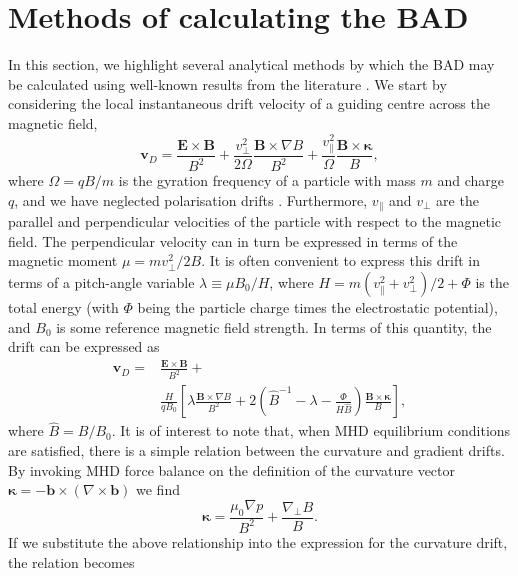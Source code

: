 \section{Methods of calculating the BAD}
In this section, we highlight several analytical methods by which the BAD may be calculated using well-known results from the literature \cite{helander2014theory}. We start by considering the local instantaneous drift velocity of a guiding centre across the magnetic field,
\begin{equation}
    \mathbf{v}_D = \frac{\mathbf{E} \times \mathbf{B}}{B^2} + \frac{ v_\perp^2}{2 \Omega}\frac{\mathbf{B} \times \nabla B}{B^2} + \frac{v_\parallel^2}{\Omega} \frac{\mathbf{B} \times \boldsymbol{\kappa}}{B},
\end{equation}
where $\Omega = q B / m$ is the gyration frequency of a particle with mass $m$ and charge $q$, and we have neglected polarisation drifts \cite{blank2004guiding}. Furthermore, $v_\parallel$ and $v_\perp$ are the parallel and perpendicular velocities of the particle with respect to the magnetic field. The perpendicular velocity can in turn be expressed in terms of the magnetic moment $\mu = m v_\perp^2 / 2 B$. It is often convenient to express this drift in terms of a pitch-angle variable $\lambda \equiv \mu B_0/H$, where $H = m (v_\|^2 + v_\perp^2)/2 + \Phi$ is the total energy (with $\Phi$ being the particle charge times the electrostatic potential), and $B_0$ is some reference magnetic field strength. In terms of this quantity, the drift can be expressed as
\begin{equation}
\begin{aligned}
    \mathbf{v}_D = &\frac{\mathbf{E} \times \mathbf{B}}{B^2} + \\
    &\frac{H}{q B_0} \left[  \lambda \frac{\mathbf{B} \times \nabla B}{B^2} + 2 \left(\hat{B}^{-1}-\lambda - \frac{\Phi}{H \hat{B}} \right) \frac{\mathbf{B} \times \boldsymbol{\kappa}}{B} \right],
\end{aligned}
\end{equation}
where $\hat{B} = B/B_0$. It is of interest to note that, when MHD equilibrium conditions are satisfied, there is a simple relation between the curvature and gradient drifts. By invoking MHD force balance on the definition of the curvature vector $\bm{\kappa} = - \mathbf{b} \times ( \nabla \times \mathbf{b} )$ we find
\begin{equation}
    \bm{\kappa} =  \frac{\mu_0 \nabla p}{B^2} + \frac{\nabla_\perp B}{B}.
\end{equation}
If we substitute the above relationship into the expression for the curvature drift, the relation becomes
